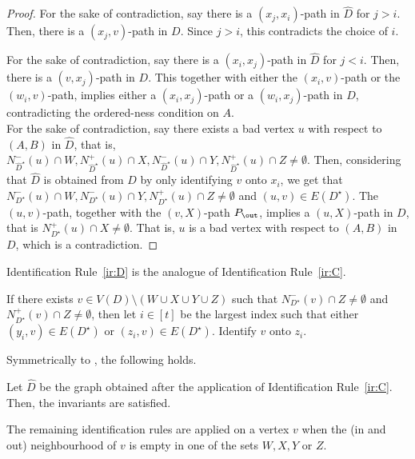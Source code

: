 \begin{proof}
For the sake of contradiction, say there is a $(x_j,x_i)$-path in $\widehat{D}$ for $j >i$. Then, there is a $(x_j,v)$-path in $D$. Since $j >i$, this contradicts the choice of $i$.

For the sake of contradiction, say there is a $(x_i,x_j)$-path in $\widehat{D}$ for $j <i$. Then, there is a $(v,x_j)$-path in $D$. This together with either the $(x_i,v)$-path or the $(w_i,v)$-path, implies either a $(x_i,x_j)$-path or a $(w_i,x_j)$-path in $D$, contradicting the ordered-ness condition on $A$.\\


 For the sake of contradiction, say there exists a bad vertex $u$ with respect to $(A,B)$ in $\widehat{D}$, that is, $N_{\widehat{D}^{\star}}^-(u) \cap W, N_{\widehat{D}^{\star}}^+(u) \cap X, N_{\widehat{D}^{\star}}^-(u) \cap Y, N_{\widehat{D}^{\star}}^+(u) \cap Z \neq \emptyset$. 
Then, considering that $\widehat{D}$ is obtained from $D$ by only identifying $v$ onto $x_i$, we get that
$N_{D^{\star}}^-(u) \cap W, N_{D^{\star}}^-(u) \cap Y, N_{D^{\star}}^+(u) \cap Z \neq \emptyset$ and $(u,v) \in E(D^{\star})$.  The $(u,v)$-path, together with the $(v,X)$-path $P_{\out}$, implies a $(u,X)$-path in $D$, that is $N_{D^{\star}}^+(u) \cap X \neq \emptyset$. That is, $u$ is a bad vertex with respect to $(A,B)$ in $D$, which is a contradiction.
\end{proof}

Identification Rule~\ref{ir:D} is the analogue of Identification Rule~\ref{ir:C}.

\begin{identification rule}\label{ir:D}
If there exists $v \in V(D) \setminus (W \cup X \cup Y \cup Z)$ such that $N_{D^{\star}}^-(v) \cap Z \neq \emptyset$ and  $N_{D^{\star}}^+(v) \cap Z \neq \emptyset$,
then let $i \in [t]$ be the largest index such that either $(y_i,v) \in E(D^{\star})$ or $(z_i,v) \in E(D^{\star})$. 
Identify $v$ onto $z_i$.
\end{identification rule}

Symmetrically to , the following holds.

\begin{lemma}\label{lem:irC-safe}
Let $\widehat{D}$ be the graph obtained after the application of Identification Rule~\ref{ir:C}. Then, the invariants are satisfied.
\end{lemma}

The remaining identification rules are applied on a vertex $v$ when the (in and out) neighbourhood of $v$ is empty in one of the sets $W,X,Y$ or $Z$.


